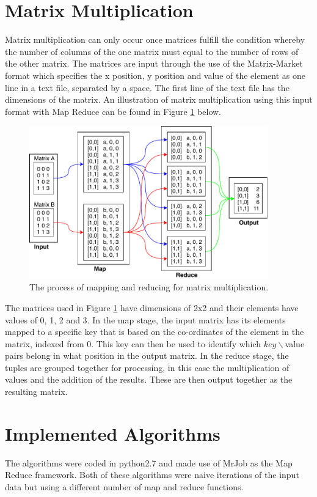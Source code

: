 \documentclass[10pt,onecolumn]{article}
\begin{document}
\section{Matrix Multiplication}
Matrix multiplication can only occur once matrices fulfill the condition whereby the number of columns of the one matrix must equal to the number of rows of the other matrix. The matrices are input through the use of the Matrix-Market format which specifies the x position, y position and value of the element as one line in a text file, separated by a space. The first line of the text file has the dimensions of the matrix. An illustration of matrix multiplication using this input format with Map Reduce can be found in Figure \ref{diagram} below.

\begin{figure}[h!]
\centering
\includegraphics[width=0.8\columnwidth,height=66mm]{diagram.pdf}
\centering
\caption{The process of mapping and reducing for matrix multiplication.}
\label{diagram}
\end{figure}

\noindent The matrices used in Figure \ref{diagram} have dimensions of 2x2 and their elements have values of 0, 1, 2 and 3. In the map stage, the input matrix has its elements mapped to a specific key that is based on the co-ordinates of the element in the matrix, indexed from 0. This key can then be used to identify which $key\backslash$value pairs belong in what position in the output matrix. In the reduce stage, the tuples are grouped together for processing, in this case the multiplication of values and the addition of the results. These are then output together as the resulting matrix.

\section{Implemented Algorithms}
The algorithms were coded in python2.7 and made use of MrJob as the Map Reduce framework. Both of these algorithms were naive iterations of the input data but using a different number of map and reduce functions.
\end{document}
